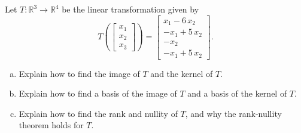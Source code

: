 
\begin{exerciseStatement}
 Let \(T:\mathbb{R}^ 3  \to \mathbb{R}^ 4 \) be the linear transformation given by \[T\left(  \left[\begin{array}{c}
x_{1} \\
x_{2} \\
x_{3}
\end{array}\right]  \right) =  \left[\begin{array}{c}
x_{1} - 6 \, x_{2} \\
-x_{1} + 5 \, x_{2} \\
-x_{2} \\
-x_{1} + 5 \, x_{2}
\end{array}\right] .\]
\begin{enumerate}[(a)]
\item Explain how to find the image of \(T\) and the kernel of \(T\).
\item Explain how to find a basis of the image of \(T\) and a basis of the kernel of \(T\).
\item Explain how to find the rank and nullity of \(T\), and why the rank-nullity theorem holds for \(T\).
\end{enumerate}
    
\end{exerciseStatement}
    
